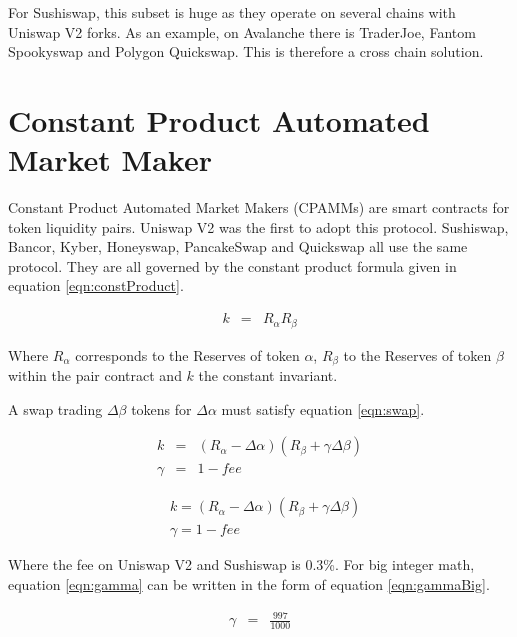 \documentclass{article}
\begin{document}
	For Sushiswap, this subset is huge as they operate on several chains with Uniswap V2 forks. As an example, on Avalanche there is TraderJoe, Fantom Spookyswap and Polygon Quickswap. This is therefore a cross chain solution.
	
	

	
	
	\section{Constant Product Automated Market Maker}
	Constant Product Automated Market Makers (CPAMMs) are smart contracts for token liquidity pairs. Uniswap V2 was the first to adopt this protocol. Sushiswap, Bancor, Kyber, Honeyswap, PancakeSwap and Quickswap all use the same protocol. They are all governed by the constant product formula given in equation \ref{eqn:constProduct}. 
	
	\begin{eqnarray}
		k  &=& R_{\alpha}  R_{\beta}  \label{eqn:constProduct}
	\end{eqnarray}
	
	Where \(R_{\alpha}\) corresponds to the Reserves of token \(\alpha\), \(R_{\beta}\) to the Reserves of token \(\beta\) within the pair contract and \( k \) the constant invariant. 
	
	A swap trading \( \Delta\beta\) tokens for \( \Delta\alpha \) must satisfy equation \ref{eqn:swap}.
	
	\begin{eqnarray}
		k  &=& (R_{\alpha} - \Delta\alpha)  (R_{\beta} + \gamma\Delta\beta ) \label{eqn:swap}\\
		\gamma  &=& 1 - fee \label{eqn:gamma}
	\end{eqnarray}
	
$$
\begin{aligned}
&k=\left(R_{\alpha}-\Delta \alpha\right)\left(R_{\beta}+\gamma \Delta \beta\right) \\
&\gamma=1-f e e
\end{aligned}
$$
	
	Where the fee on Uniswap V2 and Sushiswap is 0.3\%. For big integer math, equation \ref{eqn:gamma} can be written in the form of equation \ref{eqn:gammaBig}.
	
	\begin{eqnarray}
		\gamma  &=& \frac{997}{1000} \label{eqn:gammaBig}
	\end{eqnarray}
	
\end{document}
